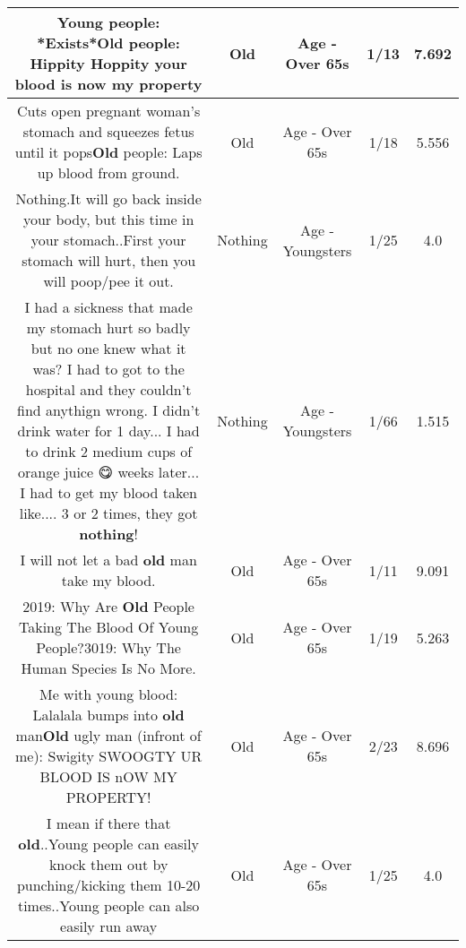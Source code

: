 \documentclass[11pt]{article}
\newlength\mylength
\begin{document}
\begin{center}
\begin{longtable}{|C{.65\mylength}|C{.30\mylength}|C{.12\mylength}|C{.12\mylength}|C{.12\mylength}|}
  \small Young people: *Exists*\textbf{Old} people: Hippity Hoppity your blood is now my property\normalsize   & Old & Age - Over 65s & 1/13 & 7.692 \\  \hline
  \small Cuts open pregnant woman's stomach and squeezes fetus until it pops\textbf{Old} people: Laps up blood from ground.\normalsize   & Old & Age - Over 65s & 1/18 & 5.556 \\  \hline
  \small Nothing.It will go back inside your body, but this time in your stomach..First your stomach will hurt, then you will poop/pee it out.\normalsize   & Nothing & Age - Youngsters & 1/25 & 4.0 \\  \hline
  \small I had a sickness that made my stomach hurt so badly but no one knew what it was? I had to got to the hospital and they couldn't find anythign wrong. I didn't drink water for 1 day... I had to drink 2 medium cups of orange juice 😋 weeks later... I had to get my blood taken like.... 3 or 2 times, they got \textbf{nothing}!\normalsize   & Nothing & Age - Youngsters & 1/66 & 1.515 \\  \hline
  \small I will not let a bad \textbf{old} man take my blood.\normalsize   & Old & Age - Over 65s & 1/11 & 9.091 \\  \hline
  \small 2019: Why Are \textbf{Old} People Taking The Blood Of Young People?3019: Why The Human Species Is No More.\normalsize   & Old & Age - Over 65s & 1/19 & 5.263 \\  \hline
  \small Me with young blood: Lalalala bumps into \textbf{old} man\textbf{Old} ugly man (infront of me): Swigity SWOOGTY UR BLOOD IS nOW MY PROPERTY!\normalsize   & Old & Age - Over 65s & 2/23 & 8.696 \\  \hline
  \small I mean if there that \textbf{old}..Young people can easily knock them out by punching/kicking them 10-20 times..Young people can also easily run away\normalsize   & Old & Age - Over 65s & 1/25 & 4.0 \\  \hline

\end{longtable}
\end{center}
\end{document}

